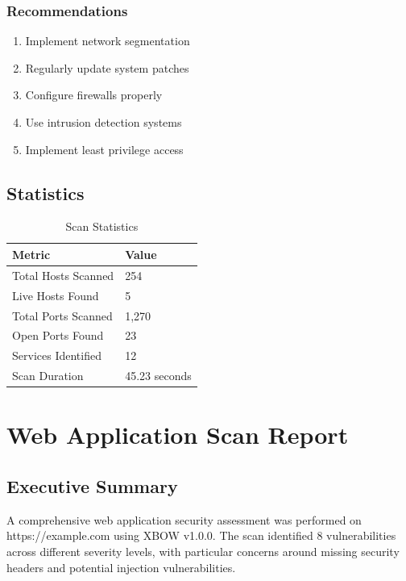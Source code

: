 \documentclass[12pt,a4paper]{report}
\begin{document}
\subsubsection{Recommendations}

\begin{enumerate}
    \item Implement network segmentation
    \item Regularly update system patches
    \item Configure firewalls properly
    \item Use intrusion detection systems
    \item Implement least privilege access
\end{enumerate}

\subsection{Statistics}

\begin{table}[H]
    \centering
    \caption{Scan Statistics}
    \label{tab:scan_stats}
    \begin{tabular}{@{}ll@{}}
        \toprule
        Metric & Value \\
        \midrule
        Total Hosts Scanned & 254 \\
        Live Hosts Found & 5 \\
        Total Ports Scanned & 1,270 \\
        Open Ports Found & 23 \\
        Services Identified & 12 \\
        Scan Duration & 45.23 seconds \\
        \bottomrule
    \end{tabular}
\end{table}

\section{Web Application Scan Report}

\subsection{Executive Summary}

A comprehensive web application security assessment was performed on https://example.com using XBOW v1.0.0. The scan identified 8 vulnerabilities across different severity levels, with particular concerns around missing security headers and potential injection vulnerabilities.
\end{document}
